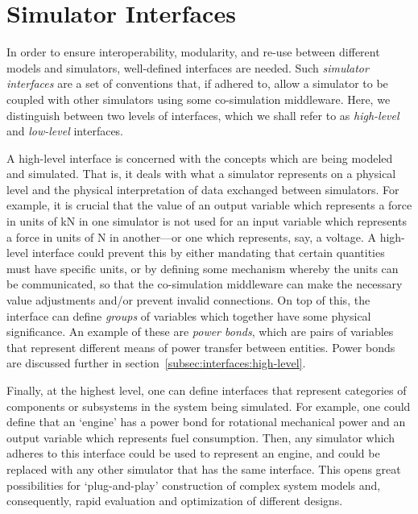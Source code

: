 \documentclass[prb,aps,showpacs,floatfix,twocolumn,10pt]{revtex4-1}
\theoremstyle{plain}
\theoremstyle{remark}
\begin{document}
\section{Simulator Interfaces}
\label{sec:interfaces}

In order to ensure interoperability, modularity, and re-use between different models and simulators, well-defined interfaces are needed.
Such \emph{simulator interfaces} are a set of conventions that, if adhered to, allow a simulator to be coupled with other simulators using some co-simulation middleware.
Here, we distinguish between two levels of interfaces, which we shall refer to as \emph{high-level} and \emph{low-level} interfaces.

A high-level interface is concerned with the concepts which are being modeled and simulated.
That is, it deals with what a simulator represents on a physical level and the physical interpretation of data exchanged between simulators.
For example, it is crucial that the value of an output variable which represents a force in units of \si{\kilo\newton} in one simulator is not used for an input variable which represents a force in units of \si{\newton} in another---or one which represents, say, a voltage.
A high-level interface could prevent this by either mandating that certain quantities must have specific units, or by defining some mechanism whereby the units can be communicated, so that the co-simulation middleware can make the necessary value adjustments and/or prevent invalid connections.
On top of this, the interface can define \emph{groups} of variables which together have some physical significance.
An example of these are \emph{power bonds}, which are pairs of variables that represent different means of power transfer between entities.
Power bonds are discussed further in section~\ref{subsec:interfaces:high-level}.

Finally, at the highest level, one can define interfaces that represent categories of components or subsystems in the system being simulated.
For example, one could define that an `engine' has a power bond for rotational mechanical power and an output variable which represents fuel consumption.
Then, any simulator which adheres to this interface could be used to represent an engine, and could be replaced with any other simulator that has the same interface.
This opens great possibilities for `plug-and-play' construction of complex system models and, consequently, rapid evaluation and optimization of different designs.
\end{document}
